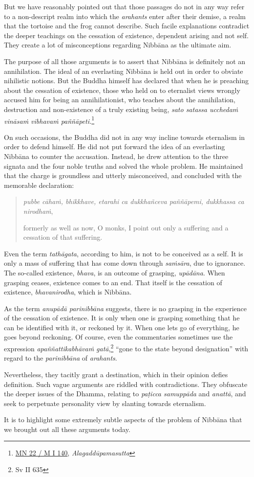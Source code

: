 But we have reasonably pointed out that those passages do not in any way refer to a non-descript realm into which the \emph{arahants} enter after their demise, a realm that the tortoise and the frog cannot describe. Such facile explanations contradict the deeper teachings on the cessation of existence, dependent arising and not self. They create a lot of misconceptions regarding Nibbāna as the ultimate aim.

The purpose of all those arguments is to assert that Nibbāna is definitely not an annihilation. The ideal of an everlasting Nibbāna is held out in order to obviate nihilistic notions. But the Buddha himself has declared that when he is preaching about the cessation of existence, those who held on to eternalist views wrongly accused him for being an annihilationist, who teaches about the annihilation, destruction and non-existence of a truly existing being, \emph{sato satassa ucchedaṁ vināsaṁ vibhavaṁ paññāpeti.}\footnote{\href{https://suttacentral.net/mn22/pli/ms}{MN 22 / M I 140}, \emph{Alagaddūpamasutta}}

On such occasions, the Buddha did not in any way incline towards eternalism in order to defend himself. He did not put forward the idea of an everlasting Nibbāna to counter the accusation. Instead, he drew attention to the three signata and the four noble truths and solved the whole problem. He maintained that the charge is groundless and utterly misconceived, and concluded with the memorable declaration:

\begin{quote}
\emph{pubbe cāhaṁ, bhikkhave, etarahi ca dukkhañceva paññāpemi, dukkhassa ca nirodhaṁ},

formerly as well as now, O monks, I point out only a suffering and a cessation of that suffering.
\end{quote}

Even the term \emph{tathāgata}, according to him, is not to be conceived as a self. It is only a mass of suffering that has come down through \emph{saṁsāra}, due to ignorance. The so-called existence, \emph{bhava}, is an outcome of grasping, \emph{upādāna}. When grasping ceases, existence comes to an end. That itself is the cessation of existence, \emph{bhavanirodha}, which is Nibbāna.

As the term \emph{anupādā parinibbāna} suggests, there is no grasping in the experience of the cessation of existence. It is only when one is grasping something that he can be identified with it, or reckoned by it. When one lets go of everything, he goes beyond reckoning. Of course, even the commentaries sometimes use the expression \emph{apaññattikabhāvaṁ gatā},\footnote{Sv II 635} ``gone to the state beyond designation'' with regard to the \emph{parinibbāna} of \emph{arahants}.

Nevertheless, they tacitly grant a destination, which in their opinion defies definition. Such vague arguments are riddled with contradictions. They obfuscate the deeper issues of the Dhamma, relating to \emph{paṭicca samuppāda} and \emph{anattā}, and seek to perpetuate personality view by slanting towards eternalism.

It is to highlight some extremely subtle aspects of the problem of Nibbāna that we brought out all these arguments today.
